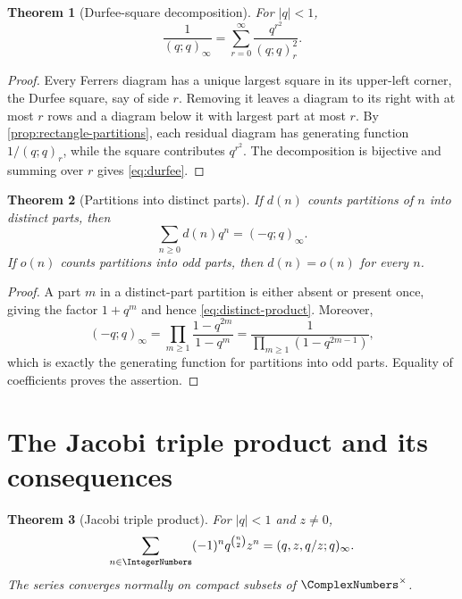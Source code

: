 \documentclass[11pt]{article}
\theoremstyle{blueplain}
\newtheorem{theorem}{Theorem}[section]
\theoremstyle{bluedef}
\begin{document}
\begin{theorem}[Durfee-square decomposition]\label{thm:durfee}
For $|q|<1$,
\begin{equation}\label{eq:durfee}
\frac1{(q;q)_\infty}=\sum_{r=0}^{\infty}\frac{q^{r^2}}{(q;q)_r^2}.
\end{equation}
\end{theorem}

\begin{proof}
Every Ferrers diagram has a unique largest square in its upper-left corner, the Durfee square, say of side $r$.  Removing it leaves a diagram to its right with at most $r$ rows and a diagram below it with largest part at most $r$.  By \cref{prop:rectangle-partitions}, each residual diagram has generating function $1/(q;q)_r$, while the square contributes $q^{r^2}$.  The decomposition is bijective and summing over $r$ gives \eqref{eq:durfee}.
\end{proof}

\begin{theorem}[Partitions into distinct parts]\label{thm:distinct-product}
If $d(n)$ counts partitions of $n$ into distinct parts, then
\begin{equation}\label{eq:distinct-product}
\sum_{n\ge0}d(n)q^n=(-q;q)_\infty.
\end{equation}
If $o(n)$ counts partitions into odd parts, then $d(n)=o(n)$ for every $n$.
\end{theorem}

\begin{proof}
A part $m$ in a distinct-part partition is either absent or present once, giving the factor $1+q^m$ and hence \eqref{eq:distinct-product}.  Moreover,
\[
(-q;q)_\infty
=\prod_{m\ge1}\frac{1-q^{2m}}{1-q^m}
=\frac1{\prod_{m\ge1}(1-q^{2m-1})},
\]
which is exactly the generating function for partitions into odd parts.  Equality of coefficients proves the assertion.
\end{proof}

\section{The Jacobi triple product and its consequences}

\begin{theorem}[Jacobi triple product]\label{thm:jtp}
For $|q|<1$ and $z\ne0$,
\begin{equation}\label{eq:jtp}
\sum_{n\in\IntegerNumbers}(-1)^nq^{\binom n2}z^n
=(q,z,q/z;q)_\infty.
\end{equation}
The series converges normally on compact subsets of $\ComplexNumbers^\times$.
\end{theorem}
\end{document}
